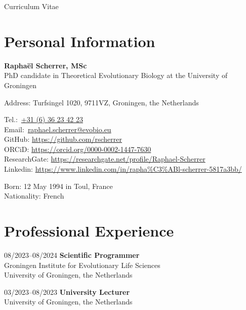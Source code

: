 \documentclass[11pt,a4paper]{article}
\newcommand\phone[1]{\href{tel:#1}{{\emailfont #1}}}
\newcommand\email[1]{\href{mailto:#1}{{\emailfont #1}}}
\newcommand\emailfont{\sffamily}
\newcommand{\CVAuthor}{\textbf{Rapha\"{e}l Scherrer, MSc}}
\begin{document}
	\begin{cv}{Curriculum Vitae}
		
		\section{Personal Information}
		
		\begin{cvlist}{}
			
			\item \CVAuthor\\
			PhD candidate in Theoretical Evolutionary Biology at the University of Groningen
			
            Address: Turfsingel 1020, 9711VZ, Groningen, the Netherlands
			
			\item 
			Tel.:~\phone{+31 (6) 36 23 42 23}\\
			Email:~\email{raphael.scherrer@evobio.eu}\\
			GitHub: \url{https://github.com/rscherrer}\\
			ORCiD: \url{https://orcid.org/0000-0002-1447-7630}\\
			ResearchGate: \url{https://researchgate.net/profile/Raphael-Scherrer}\\
			Linkedin: \url{https://www.linkedin.com/in/rapha%C3%ABl-scherrer-5817a3bb/}
			
			\item 
			Born: 12 May 1994 in Toul, France\\
			Nationality: French
			
		\end{cvlist}

        \section{Professional Experience}

        \begin{cvlist}{}

            \item[08/2023--08/2024]
            \textbf{Scientific Programmer}\\
            Groningen Institute for Evolutionary Life Sciences\\
            University of Groningen, the Netherlands

            \item[03/2023--08/2023]
            \textbf{University Lecturer}\\
            University of Groningen, the Netherlands
            

\end{cvlist}
\end{cv}
\end{document}
